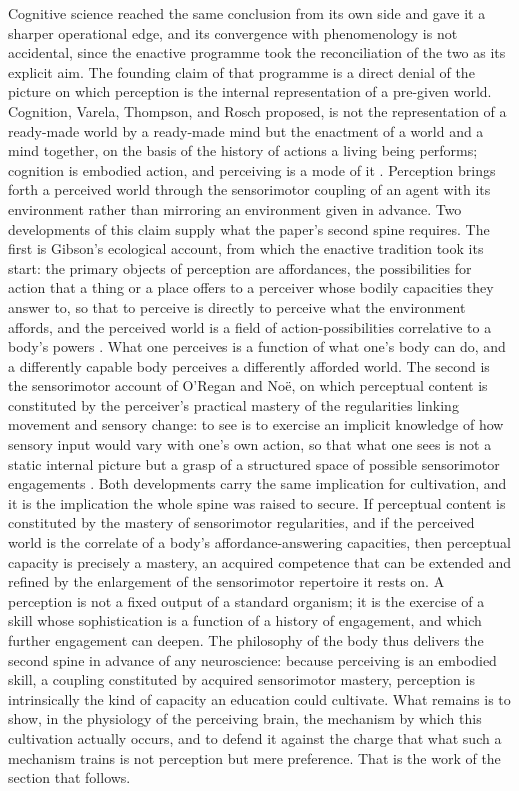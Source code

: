 Cognitive science reached the same conclusion from its own side and gave it a sharper operational edge, and its convergence with phenomenology is not accidental, since the enactive programme took the reconciliation of the two as its explicit aim. The founding claim of that programme is a direct denial of the picture on which perception is the internal representation of a pre-given world. Cognition, Varela, Thompson, and Rosch proposed, is not the representation of a ready-made world by a ready-made mind but the enactment of a world and a mind together, on the basis of the history of actions a living being performs; cognition is embodied action, and perceiving is a mode of it \parencite{varela1991}. Perception brings forth a perceived world through the sensorimotor coupling of an agent with its environment rather than mirroring an environment given in advance. Two developments of this claim supply what the paper's second spine requires. The first is Gibson's ecological account, from which the enactive tradition took its start: the primary objects of perception are affordances, the possibilities for action that a thing or a place offers to a perceiver whose bodily capacities they answer to, so that to perceive is directly to perceive what the environment affords, and the perceived world is a field of action-possibilities correlative to a body's powers \parencite{gibson1979}. What one perceives is a function of what one's body can do, and a differently capable body perceives a differently afforded world. The second is the sensorimotor account of O'Regan and No\"{e}, on which perceptual content is constituted by the perceiver's practical mastery of the regularities linking movement and sensory change: to see is to exercise an implicit knowledge of how sensory input would vary with one's own action, so that what one sees is not a static internal picture but a grasp of a structured space of possible sensorimotor engagements \parencite{oregannoe2001,noe2004}. Both developments carry the same implication for cultivation, and it is the implication the whole spine was raised to secure. If perceptual content is constituted by the mastery of sensorimotor regularities, and if the perceived world is the correlate of a body's affordance-answering capacities, then perceptual capacity is precisely a mastery, an acquired competence that can be extended and refined by the enlargement of the sensorimotor repertoire it rests on. A perception is not a fixed output of a standard organism; it is the exercise of a skill whose sophistication is a function of a history of engagement, and which further engagement can deepen. The philosophy of the body thus delivers the second spine in advance of any neuroscience: because perceiving is an embodied skill, a coupling constituted by acquired sensorimotor mastery, perception is intrinsically the kind of capacity an education could cultivate. What remains is to show, in the physiology of the perceiving brain, the mechanism by which this cultivation actually occurs, and to defend it against the charge that what such a mechanism trains is not perception but mere preference. That is the work of the section that follows.
